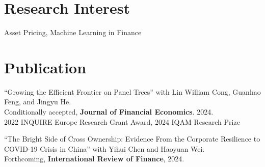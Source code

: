 \documentclass{clean_cv}
\begin{document}
\section{Research Interest}
\begin{center}
	Asset Pricing, Machine Learning in Finance
\end{center}

\section{Publication}

\begin{etaremune}
	\setlength\itemsep{1.0em}
	

	\item “Growing the Efficient Frontier on Panel Trees” 
	with Lin William Cong, Guanhao Feng, and Jingyu He. \\
		Conditionally accepted, \textbf{Journal of Financial Economics}. 2024. \\
		2022 INQUIRE Europe Research Grant Award, 
		2024 IQAM Research Prize
			
	\item “The Bright Side of Cross Ownership: Evidence From the Corporate Resilience to COVID-19 Crisis in China” 
	with Yihui Chen and Haoyuan Wei. \\
	Forthcoming, \textbf{International Review of Finance}, 2024.
	
\end{etaremune}


\end{document}

